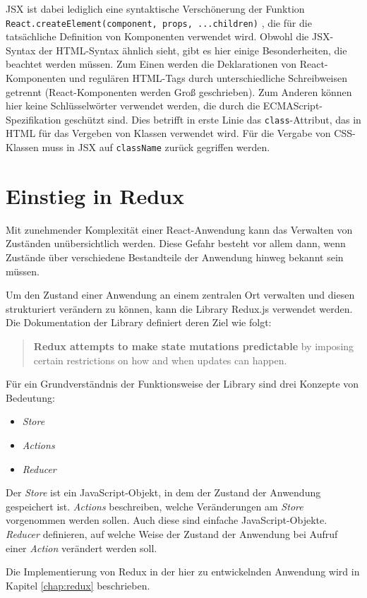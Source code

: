 JSX ist dabei lediglich eine syntaktische Verschönerung der Funktion \verb|React.createElement(component, props, ...children)| \cite{ReactJSX}, die für die tatsächliche Definition von Komponenten verwendet wird.
Obwohl die JSX-Syntax der HTML-Syntax ähnlich sieht, gibt es hier einige Besonderheiten, die beachtet werden müssen.
Zum Einen werden die Deklarationen von React-Komponenten und regulären HTML-Tags durch unterschiedliche Schreibweisen getrennt (React-Komponenten werden Groß geschrieben).
Zum Anderen können hier keine Schlüsselwörter verwendet werden, die durch die ECMAScript-Spezifikation geschützt sind\footnotemark{}. Dies betrifft in erste Linie das \verb|class|-Attribut, das in HTML für das Vergeben von Klassen verwendet wird. Für die Vergabe von CSS-Klassen muss in JSX auf \verb|className| zurück gegriffen werden.


\section{Einstieg in Redux}
Mit zunehmender Komplexität einer React-Anwendung kann das Verwalten von Zuständen unübersichtlich werden. Diese Gefahr besteht vor allem dann, wenn Zustände über verschiedene Bestandteile der Anwendung hinweg bekannt sein müssen.

Um den Zustand einer Anwendung an einem zentralen Ort verwalten und diesen strukturiert verändern zu können, kann die Library Redux.js\footnotemark{} verwendet werden. Die Dokumentation der Library definiert deren Ziel wie folgt:


\begin{quote}
  \textbf{Redux attempts to make state mutations predictable} by imposing certain restrictions on how and when updates can happen. \cite{ReduxMotivation}
\end{quote}

Für ein Grundverständnis der Funktionsweise der Library sind drei Konzepte von Bedeutung:

\begin{itemize}
  \item \textit{Store}
  \item \textit{Actions}
  \item \textit{Reducer}
\end{itemize}

Der \textit{Store} ist ein JavaScript-Objekt, in dem der Zustand der Anwendung gespeichert ist. \textit{Actions} beschreiben, welche Veränderungen am \textit{Store} vorgenommen werden sollen. Auch diese sind einfache JavaScript-Objekte. \textit{Reducer} definieren, auf welche Weise der Zustand der Anwendung bei Aufruf einer \textit{Action} verändert werden soll. \cite{ReduxCore}

Die Implementierung von Redux in der hier zu entwickelnden Anwendung wird in Kapitel \ref{chap:redux} beschrieben.
